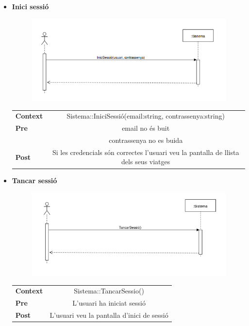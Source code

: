 \begin{itemize}
\item[]{\textbf{Inici sessió}}

\begin{figure}[!h]
\centering
\includegraphics[scale=0.8]{Figures/IniciSessioEC.png}
\end{figure}

\begin{table}[!h]
\centering
\begin{tabular}{l C}
\textbf{Context}  & Sistema::IniciSessió(email:string, contrassenya:string) \\
\textbf{Pre} & email no és buit\\
 & contrassenya no es buida\\
\textbf{Post} &  Si les credencials són correctes l'usuari veu la pantalla de llista dels seus viatges\\
\end{tabular}
\label{}
\end{table}

\clearpage

\item[]{\textbf{Tancar sessió}}

\begin{figure}[!h]
\centering
\includegraphics[scale=0.8]{Figures/TancarSessioEC.png}
\end{figure}

\begin{table}[!h]
\centering
\begin{tabular}{l C}
\textbf{Context}  & Sistema::TancarSessio() \\
\textbf{Pre} & L'usuari ha iniciat sessió\\
\textbf{Post} &  L'usuari veu la pantalla d'inici de sessió\\
\end{tabular}
\label{}
\end{table}


\end{itemize}
